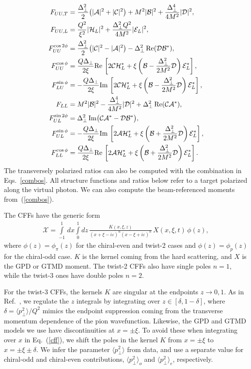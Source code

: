 \documentclass[aps,prd,showpacs,notitlepage,nofootinbib,preprintnumbers,amsmath,amssymb]{revtex4-2}
\def\eq#1{{Eq.~(\ref{#1})}}
\newcommand{\cA}{\mathcal A}
\newcommand{\cB}{\mathcal B}
\newcommand{\cC}{\mathcal C}
\newcommand{\cH}{\mathcal H_L}
\newcommand{\cE}{\mathcal E_L}
\newcommand{\cD}{\mathcal D}
\newcommand{\Dp}{\Delta_\perp}
\begin{document}
\begin{subequations}\label{sfs}
\begin{align}
F_{UU,T}&=\frac{\Dp^2}{2}\big(|\cA|^2+|\cC|^2\big)+M^2|\cB|^2+\frac{\Dp^4}{4M^2}|\cD|^2,
\\
F_{UU,L}&=\frac{Q^2}{\xi^2}|\cH|^2+\frac{\Dp^2Q^2}{4M^2}|\cE|^2,
\\
F_{UU}^{\cos2\phi}&=\frac{\Dp^2}{2}\big(|\cC|^2-|\cA|^2\big)-\Dp^2\,{\rm Re}(\cD\cB^*),
\\
F_{UU}^{\cos\phi}&=\frac{Q\Dp}{2\xi}{\rm Re}\,\left[2\cC\cH^*+\xi\left(\cB-\frac{\Dp^2}{2M^2}\cD\right)\cE^*\right],
\\
F_{LU}^{\sin\phi}&=-\frac{Q\Dp}{2\xi}{\rm Im}\,\left[2\cC\cH^*+\xi\left(\cB-\frac{\Dp^2}{2M^2}\cD\right)\cE^*\right],
\\
F_{LL}&=M^2|\cB|^2-\frac{\Dp^4}{4M^2}|\cD|^2+\Dp^2\,{\rm Re}(\cC\cA^*),
\\
F_{UL}^{\sin2\phi}&=\Dp^2\,{\rm Im}\big(\cC\cA^*-\cD\cB^*\big),
\\
F_{UL}^{\sin\phi}&=-\frac{Q\Dp}{2\xi}{\rm Im}\,\left[2\cA\cH^*+\xi\left(\cB+\frac{\Dp^2}{2M^2}\cD\right)\cE^*\right],
\\
F_{LL}^{\cos\phi}&=\frac{Q\Dp}{2\xi}{\rm Re}\,\left[2\cA\cH^*+\xi\left(\cB+\frac{\Dp^2}{2M^2}\cD\right)\cE^*\right].
\end{align}
\end{subequations}
The transversely polarized ratios can also be computed with the combination in Eqs.~\eqref{combos}. All structure functions and ratios below refer to a target polarized along the virtual photon. We can also compute the beam-referenced moments from~(\ref{combos}).


The CFFs have the generic form
\begin{align} \label{cff}
    \mathcal{X} = \int \limits^1_{-1} \, dx 
    \int \limits^1_0 dz \, \frac{K(x, \xi, z)}{(x + \xi - i \varepsilon)^n (x - \xi + i \varepsilon)^n} \, 
    X(x, \xi, t) \, \phi (z),
\end{align}
where $\phi(z) = \phi_\pi(z)$ for the chiral-even and twist-2 cases and $\phi(z)=\phi_p(z)$ for the chiral-odd case. $K$ is the kernel coming from the hard scattering, and $X$ is the GPD or GTMD moment. The twist-2 CFFs also have single poles $n=1$, while the twist-3 ones have double poles $n=2$. 

For the twist-3 CFFs, the kernels $K$ are singular at the endpoints $z\to0,1$. As in Ref.~\cite{Bhattacharya:2023hbq}, we regulate the $z$ integrals by integrating over $z \in [\delta, 1- \delta]$, where $\delta = \langle p_\perp^2\rangle/Q^2$ mimics the endpoint suppression coming from the transverse momentum dependence of the pion wavefunction. Likewise, the GPD and GTMD models we use have discontinuities at $x=\pm\xi$. To avoid these when integrating over $x$ in \eq{cff}, we shift the poles in the kernel $K$ from $x= \pm \xi$ to $x=\pm\xi\pm\delta$. We infer the parameter $\langle p_\perp^2\rangle$ from data, and use a separate value for chiral-odd and chiral-even contributions, $\langle p_\perp^2\rangle_o$ and $\langle p_\perp^2\rangle_e$, respectively.
\end{document}
